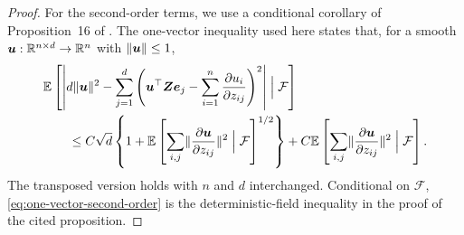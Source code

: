 \documentclass{article}
\theoremstyle{plain} %
\theoremstyle{definition} %
\theoremstyle{definition} %
\begin{document}
\begin{proof}
For the second-order terms, we use a conditional corollary of
Proposition~16 of \citet{bellec2022derivatives}. The one-vector inequality
used here states that, for a smooth
$\boldsymbol{u}:{\mathbb{R}}^{n\times d}\to{\mathbb{R}}^n$ with $\lVert\boldsymbol{u}\rVert\leq1$,
\begin{align}
    &{\mathbb{E}}\left[
       \left|d\lVert\boldsymbol{u}\rVert^2-
       \sum_{j=1}^d\left(
          \boldsymbol{u}^\top\boldsymbol{Z}\boldsymbol{e}_j-
          \sum_{i=1}^n\pdv{u_i}{z_{ij}}
       \right)^2\right|
       \mathrel{\Big|}\mathcal F
    \right]\notag\\
    &\qquad\leq
       C\sqrt d\left\{1+
       {\mathbb{E}}\left[
          \sum_{i,j}\lVert\pdv{\boldsymbol{u}}{z_{ij}}\rVert^2
          \mathrel{\Big|}\mathcal F
       \right]^{1/2}\right\}
       +C{\mathbb{E}}\left[
          \sum_{i,j}\lVert\pdv{\boldsymbol{u}}{z_{ij}}\rVert^2
          \mathrel{\Big|}\mathcal F
       \right].
    \label{eq:one-vector-second-order}
\end{align}
The transposed version holds with $n$ and $d$ interchanged.  Conditional on
$\mathcal F$, \eqref{eq:one-vector-second-order} is the deterministic-field inequality in the proof of the
cited proposition.


\end{proof}
\end{document}
